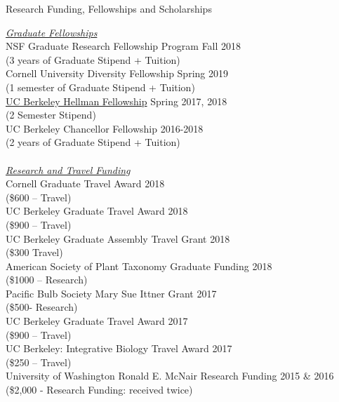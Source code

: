 \documentclass{resume} %
\newcommand\ntab[1][.25cm]{\hspace*{#1}}
\begin{document}
\begin{rSection}{Research Funding, Fellowships and Scholarships} \itemsep -2pt

\underline{\textit{Graduate Fellowships} } \\
NSF Graduate Research Fellowship Program \hfill Fall 2018 \\
\ntab(3 years of Graduate Stipend + Tuition) \\
\newpage
Cornell University Diversity Fellowship \hfill Spring 2019 \\
\ntab(1 semester of Graduate Stipend + Tuition) \\
\href{http://www.hellmanfellows.org/graduate-awardees/21069/}{UC Berkeley Hellman Fellowship} \hfill	Spring 2017, 2018 \\
\ntab(2 Semester Stipend) \\	
UC Berkeley Chancellor Fellowship \hfill 2016-2018 \\
\ntab(2 years of Graduate Stipend + Tuition) \\
\\
\underline{\textit{Research and Travel Funding} }
\\
Cornell  Graduate Travel Award \hfill 2018 \\
\ntab(\$600 – Travel) \\
UC Berkeley Graduate Travel Award \hfill 2018 \\
\ntab(\$900 – Travel) \\
UC Berkeley Graduate Assembly Travel Grant \hfill	2018 \\
\ntab(\$300 Travel) \\	
American Society of Plant Taxonomy Graduate Funding	 \hfill	2018 \\
\ntab(\$1000 – Research) \\
Pacific Bulb Society Mary Sue Ittner Grant \hfill 2017 \\
\ntab(\$500- Research) \\
UC Berkeley Graduate Travel Award \hfill 2017 \\
\ntab(\$900 – Travel)	\\
UC Berkeley: Integrative Biology Travel Award \hfill 2017 \\
\ntab(\$250 – Travel)	\\
University of Washington Ronald E. McNair Research Funding \hfill 2015 \& 2016 \\
\ntab(\$2,000 - Research Funding: received twice) \\

\end{rSection}
\end{document}
